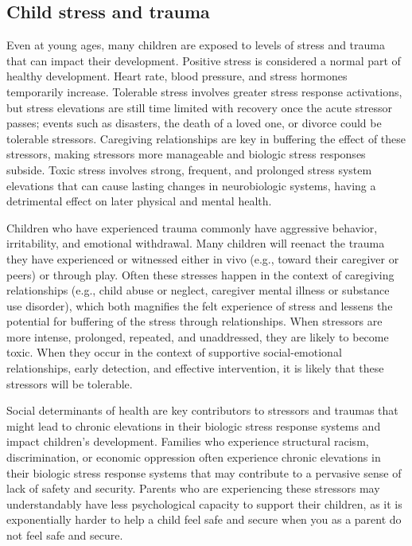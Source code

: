 \subsection{Child stress and trauma}
Even at young ages, many children are exposed to levels of stress and trauma
that can impact their development. Positive stress is considered a normal part
of healthy development. Heart rate, blood pressure, and stress hormones
temporarily increase. Tolerable stress involves greater stress response
activations, but stress elevations are still time limited with recovery once
the acute stressor passes; events such as disasters, the death of a loved one,
or divorce could be tolerable stressors. Caregiving relationships are key in
buffering the effect of these stressors, making stressors more manageable and
biologic stress responses subside. Toxic stress involves strong, frequent, and
prolonged stress system elevations that can cause lasting changes in
neurobiologic systems, having a detrimental effect on later physical and mental
health. \cite{Feldman3}

Children who have experienced trauma commonly have aggressive behavior,
irritability, and emotional withdrawal. Many children will reenact the trauma
they have experienced or witnessed either in vivo (e.g., toward their caregiver
or peers) or through play. Often these stresses happen in the context of 
caregiving relationships (e.g., child abuse or neglect, caregiver mental
illness or substance use disorder), which both magnifies the felt experience of
stress and lessens the potential for buffering of the stress through
relationships. When stressors are more intense, prolonged, repeated, and
unaddressed, they are likely to become toxic. When they occur in the context of
supportive social-emotional relationships, early detection, and effective
intervention, it is likely that these stressors will be tolerable.
\cite{Feldman3}

Social determinants of health are key contributors to stressors and traumas
that might lead to chronic elevations in their biologic stress response systems
and impact children’s development. Families who experience structural racism,
discrimination, or economic oppression often experience chronic elevations in
their biologic stress response systems that may contribute to a pervasive sense
of lack of safety and security. Parents who are experiencing these stressors
may understandably have less psychological capacity to support their children,
as it is exponentially harder to help a child feel safe and secure when you as
a parent do not feel safe and secure.
\cite{Feldman3}

